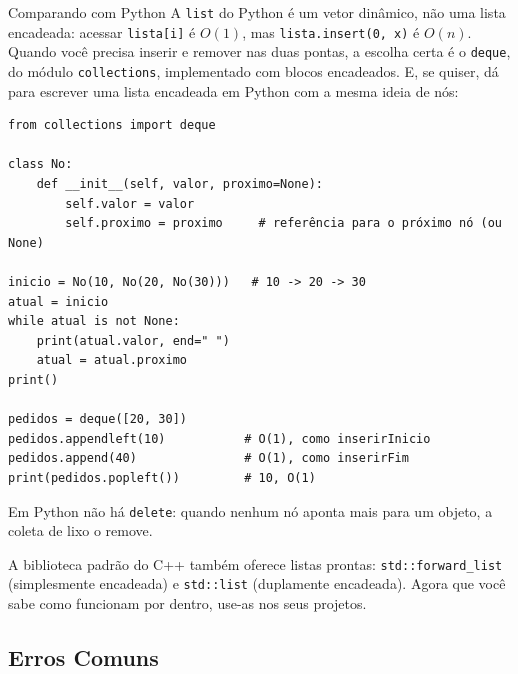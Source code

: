 \begin{destaque}{Comparando com Python}
A \texttt{list} do Python é um vetor dinâmico, não uma lista encadeada: acessar \texttt{lista[i]} é $O(1)$, mas \texttt{lista.insert(0, x)} é $O(n)$. Quando você precisa inserir e remover nas duas pontas, a escolha certa é o \texttt{deque}, do módulo \texttt{collections}, implementado com blocos encadeados. E, se quiser, dá para escrever uma lista encadeada em Python com a mesma ideia de nós:

\begin{codigo}
\begin{Verbatim}[breaklines=true, breaksymbolleft={}, fontsize=\footnotesize]
from collections import deque

class No:
    def __init__(self, valor, proximo=None):
        self.valor = valor
        self.proximo = proximo     # referência para o próximo nó (ou None)

inicio = No(10, No(20, No(30)))   # 10 -> 20 -> 30
atual = inicio
while atual is not None:
    print(atual.valor, end=" ")
    atual = atual.proximo
print()

pedidos = deque([20, 30])
pedidos.appendleft(10)           # O(1), como inserirInicio
pedidos.append(40)               # O(1), como inserirFim
print(pedidos.popleft())         # 10, O(1)
\end{Verbatim}
\end{codigo}

Em Python não há \texttt{delete}: quando nenhum nó aponta mais para um objeto, a coleta de lixo o remove.
\end{destaque}

A biblioteca padrão do C++ também oferece listas prontas: \texttt{std::forward\_list} (simplesmente encadeada) e \texttt{std::list} (duplamente encadeada). Agora que você sabe como funcionam por dentro, use-as nos seus projetos.

\subsection{Erros Comuns}

